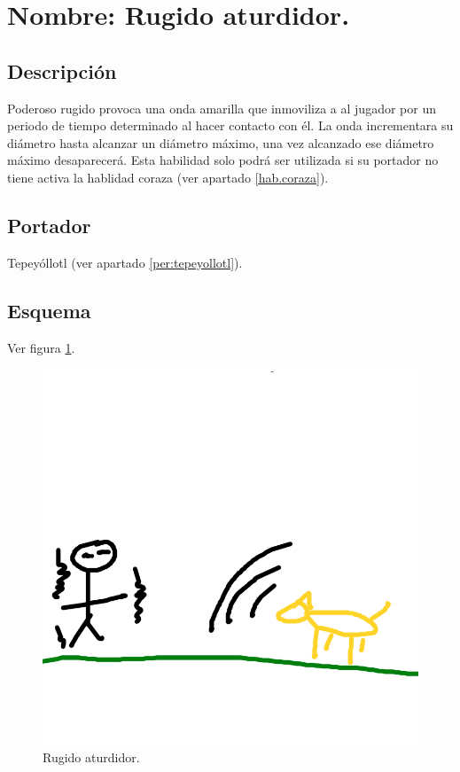 \section{Nombre: Rugido aturdidor.}\label{hab.RugAtur}
\subsection{Descripción}
Poderoso rugido provoca una onda amarilla que inmoviliza a al jugador por un periodo de tiempo determinado al hacer contacto con él. La onda incrementara su diámetro hasta alcanzar un diámetro máximo, una vez alcanzado ese diámetro máximo desaparecerá. Esta habilidad solo podrá ser utilizada si su portador no tiene activa la hablidad coraza (ver apartado \ref{hab.coraza}).
\subsection{Portador}
Tepeyóllotl (ver apartado \ref{per:tepeyollotl}). 
\subsection{Esquema}
			Ver figura \ref{fig:rugido}.
			\begin{figure}
				\centering
				\includegraphics[height=0.2 \textheight]{Imagenes/rugido}
				\caption{Rugido aturdidor.}
				\label{fig:rugido}
			\end{figure}
			
